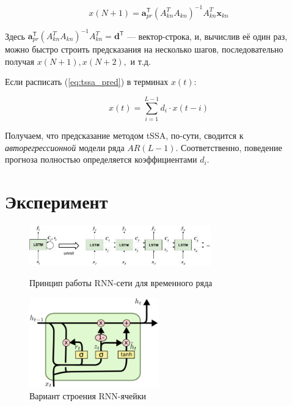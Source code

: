 	    	\begin{equation}\label{eq:tssa_pred}
	    		x(N + 1) = \mathbf{a}_{pr}^{\mathsf{T}} (A_{kn}^T A_{kn})^{-1} A_{kn}^T \mathbf{x}_{kn}
	    	\end{equation}
	    
	    	 Здесь $ \mathbf{a}_{pr}^{\mathsf{T}} (A_{kn}^T A_{kn})^{-1} A_{kn}^T = \mathbf{d}^{\mathsf{T}} $ --- вектор-строка, и, вычислив её один раз, можно быстро строить предсказания на несколько шагов, последовательно получая $ x(N + 1), x(N + 2), $  и т.д.
	    	 
	    	 Если расписать (\ref{eq:tssa_pred}) в терминах $ x(t) $:
	    	 
	    	 \begin{equation*}\label{eq:autoregr}
	    	 	x(t) = \sum\limits_{i = 1}^{L - 1} d_i \cdot x(t - i)
	    	 \end{equation*}
	    	 
	    	 Получаем, что предсказание методом tSSA, по-сути, сводится к \textit{авторегрессионной} модели ряда $ AR(L - 1) $. Соответственно, поведение прогноза полностью определяется коэффициентами $ d_i $.
	    
	\section{Эксперимент}	
			
			\begin{figure}[h]
				\centering
				\includegraphics[width=0.7\textwidth, keepaspectratio]{../figs/lstm.jpg}
				\caption{Принцип работы RNN-сети для временного ряда}\label{pic:rnn_ilustr}
				\includegraphics[width=0.5\textwidth, keepaspectratio]{../figs/rnn_unit.png}
				\caption{Вариант строения RNN-ячейки}\label{pic:rnn_unit}
			\end{figure}
		
		\newpage
		\printbibliography
	
